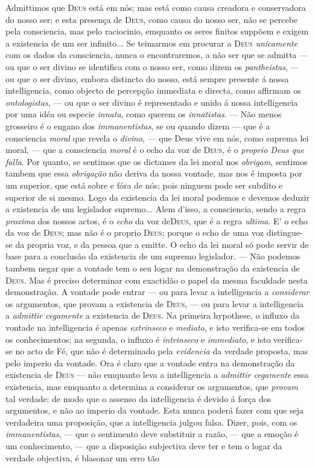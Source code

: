 Admittimos que \textsc{Deus} está em nós; mas está como causa creadora e conservadora do nosso ser; e esta presença de \textsc{Deus}, como causa do nosso ser, não se percebe pela consciencia, mas pelo raciocinio, emquanto os seres finitos suppõem e exigem a existencia de um ser infinito... Se teimarmos em procurar a \textsc{Deus} \emph{unicamente} com os dados da consciencia, nunca o encontraremos, a não ser que se admitta --- ou que o ser divino se identifica com o nosso ser, como dizem os \emph{pantheistas}, --- ou que o ser divino, embora distincto do nosso, está sempre presente á nossa intelligencia, como objecto de percepção immediata e directa, como affirmam os \emph{ontologistas}, --- ou que o ser divino é representado e unido á nossa intelligencia por uma idéa ou especie \emph{innata}, como querem os \emph{innatistas}. --- Não menos grosseiro é o engano dos \emph{immanentistas}, se ou quando dizem --- que é a consciencia \emph{moral} que revela o \emph{divino}, --- que Deus vive em nós, como suprema lei moral, --- que a consciencia \emph{moral} é o echo da voz de \textsc{Deus}, é o \emph{proprio Deus que falla}. Por quanto, se sentimos que os dictames da lei moral nos \emph{obrigam}, sentimos tambem que essa \emph{obrigação} não deriva da nossa vontade, mas nos é imposta por um superior, que está sobre e fóra de nós; pois ninguem pode ser subdito e superior de si mesmo. Logo da existencia da lei moral podemos e devemos deduzir a existencia de um legislador supremo... Alem d'isso, a consciencia, sendo a regra \emph{proxima} dos nossos actos, é o \emph{echo} da voz de\textsc{Deus}, que é a regra \emph{ultima}. E' o echo da voz de \textsc{Deus}; mas não é o proprio \textsc{Deus}; porque o echo de uma voz distingue-se da propria voz, e da pessoa que a emitte. O echo da lei moral só pode servir de base para a conclusão da existencia de um supremo legislador. --- Não podemos tambem negar que a vontade tem o seu logar na demonstração da existencia de \textsc{Deus}. Mas é preciso determinar com exactidão o papel da mesma faculdade nesta demonstração. A vontade pode entrar --- ou para levar a intelligencia a \emph{considerar} os argumentos, que provam a existencia de \textsc{Deus}, --- ou para levar a intelligencia a \emph{admittir cegamente} a existencia de \textsc{Deus}. Na primeira hypothese, o influxo da vontade na intelligencia é apenas \emph{extrinseco} e \emph{mediato}, e isto verifica-se em todos os conhecimentos; na segunda, o influxo é \emph{intrinseco} e \emph{immediato}, e isto verifica-se no acto de Fé, que não é determinado pela \emph{evidencia} da verdade proposta, mas pelo imperio da vontade. Ora é claro que a vontade entra na demonstração da existencia de \textsc{Deus} --- não emquanto leva a intelligencia a \emph{admittir cegamente} essa existencia, mas emquanto a determina a considerar os argumentos, que \emph{provam} tal verdade; de modo que o assenso da intelligencia é devido á força dos argumentos, e não ao imperio da vontade. Esta nunca poderá fazer com que seja verdadeira uma proposição, que a intelligencia julgou falsa. Dizer, pois, com os \emph{immanentistas}, --- que o sentimento deve substituir a razão, --- que a emoção é um conhecimento, --- que a disposição subjectiva deve ter e tem o logar da verdade objectiva, é blasonar um erro tão 